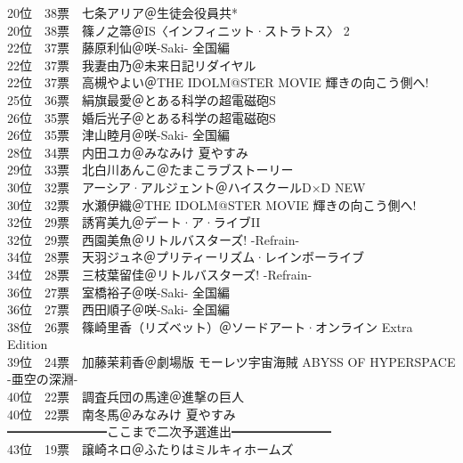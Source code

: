 {    20位　38票　七条アリア＠生徒会役員共*                                            \\
    20位　38票　篠ノ之箒＠IS〈インフィニット·ストラトス〉 2                         \\
    22位　37票　藤原利仙＠咲-Saki- 全国編                                            \\
    22位　37票　我妻由乃＠未来日記リダイヤル                                         \\
    22位　37票　高槻やよい＠THE IDOLM@STER MOVIE 輝きの向こう側へ!                   \\
    25位　36票　絹旗最愛＠とある科学の超電磁砲S                                      \\
    26位　35票　婚后光子＠とある科学の超電磁砲S                                      \\
    26位　35票　津山睦月＠咲-Saki- 全国編                                            \\
    28位　34票　内田ユカ＠みなみけ 夏やすみ                                          \\
    29位　33票　北白川あんこ＠たまこラブストーリー                                   \\
    30位　32票　アーシア·アルジェント＠ハイスクールD×D NEW                         \\
    30位　32票　水瀬伊織＠THE IDOLM@STER MOVIE 輝きの向こう側へ!                     \\
    32位　29票　誘宵美九＠デート·ア·ライブII                                       \\
    32位　29票　西園美魚＠リトルバスターズ! -Refrain-                                \\
    34位　28票　天羽ジュネ＠プリティーリズム·レインボーライブ                       \\
    34位　28票　三枝葉留佳＠リトルバスターズ! -Refrain-                              \\
    36位　27票　室橋裕子＠咲-Saki- 全国編                                            \\
    36位　27票　西田順子＠咲-Saki- 全国編                                            \\
    38位　26票　篠崎里香（リズベット）＠ソードアート·オンライン Extra Edition       \\
    39位　24票　加藤茉莉香＠劇場版 モーレツ宇宙海賊 ABYSS OF HYPERSPACE -亜空の深淵- \\
    40位　22票　調査兵団の馬達＠進撃の巨人                                           \\
    40位　22票　南冬馬＠みなみけ 夏やすみ                                            \\
    ━━━━━━━━ここまで二次予選進出━━━━━━━━                             \\
    43位　19票　譲崎ネロ＠ふたりはミルキィホームズ
}

